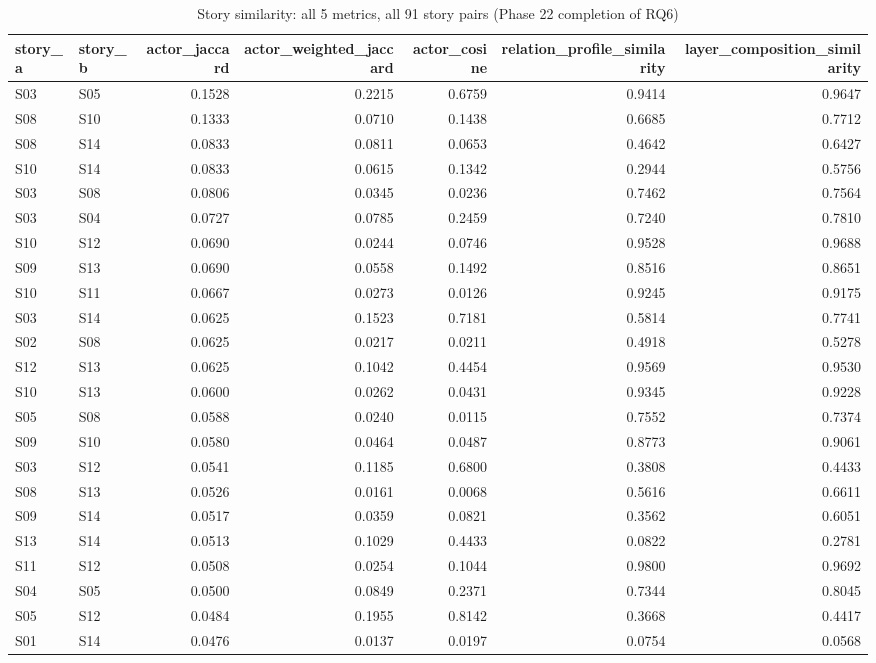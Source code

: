 \begin{table}
\caption{Story similarity: all 5 metrics, all 91 story pairs (Phase 22 completion of RQ6)}
\label{tab:t08_story_similarity}
\begin{tabular}{llrrrrr}
\toprule
story_a & story_b & actor_jaccard & actor_weighted_jaccard & actor_cosine & relation_profile_similarity & layer_composition_similarity \\
\midrule
S03 & S05 & 0.1528 & 0.2215 & 0.6759 & 0.9414 & 0.9647 \\
S08 & S10 & 0.1333 & 0.0710 & 0.1438 & 0.6685 & 0.7712 \\
S08 & S14 & 0.0833 & 0.0811 & 0.0653 & 0.4642 & 0.6427 \\
S10 & S14 & 0.0833 & 0.0615 & 0.1342 & 0.2944 & 0.5756 \\
S03 & S08 & 0.0806 & 0.0345 & 0.0236 & 0.7462 & 0.7564 \\
S03 & S04 & 0.0727 & 0.0785 & 0.2459 & 0.7240 & 0.7810 \\
S10 & S12 & 0.0690 & 0.0244 & 0.0746 & 0.9528 & 0.9688 \\
S09 & S13 & 0.0690 & 0.0558 & 0.1492 & 0.8516 & 0.8651 \\
S10 & S11 & 0.0667 & 0.0273 & 0.0126 & 0.9245 & 0.9175 \\
S03 & S14 & 0.0625 & 0.1523 & 0.7181 & 0.5814 & 0.7741 \\
S02 & S08 & 0.0625 & 0.0217 & 0.0211 & 0.4918 & 0.5278 \\
S12 & S13 & 0.0625 & 0.1042 & 0.4454 & 0.9569 & 0.9530 \\
S10 & S13 & 0.0600 & 0.0262 & 0.0431 & 0.9345 & 0.9228 \\
S05 & S08 & 0.0588 & 0.0240 & 0.0115 & 0.7552 & 0.7374 \\
S09 & S10 & 0.0580 & 0.0464 & 0.0487 & 0.8773 & 0.9061 \\
S03 & S12 & 0.0541 & 0.1185 & 0.6800 & 0.3808 & 0.4433 \\
S08 & S13 & 0.0526 & 0.0161 & 0.0068 & 0.5616 & 0.6611 \\
S09 & S14 & 0.0517 & 0.0359 & 0.0821 & 0.3562 & 0.6051 \\
S13 & S14 & 0.0513 & 0.1029 & 0.4433 & 0.0822 & 0.2781 \\
S11 & S12 & 0.0508 & 0.0254 & 0.1044 & 0.9800 & 0.9692 \\
S04 & S05 & 0.0500 & 0.0849 & 0.2371 & 0.7344 & 0.8045 \\
S05 & S12 & 0.0484 & 0.1955 & 0.8142 & 0.3668 & 0.4417 \\
S01 & S14 & 0.0476 & 0.0137 & 0.0197 & 0.0754 & 0.0568 \\

\end{tabular}
\end{table}

